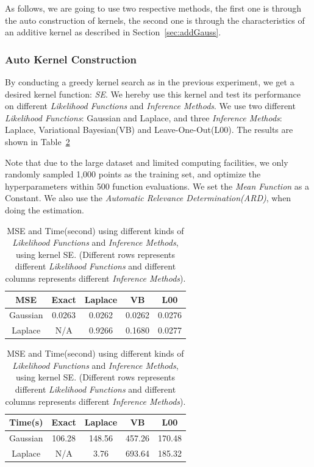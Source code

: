 As follows, we are going to use two respective methods, the first one is through the auto construction of kernels, the second one is through the characteristics of an additive kernel as described in Section~\ref{sec:addGauss}.

\subsubsection{Auto Kernel Construction} \label{sec:pred2auto}
By conducting a greedy kernel search as in the previous experiment, we get a desired kernel function: \emph{SE}.
We hereby use this kernel and test its performance on different \emph{Likelihood Functions} and \emph{Inference Methods}.
We use two different \emph{Likelihood Functions}: Gaussian and Laplace, and three \emph{Inference Methods}: Laplace, Variational Bayesian(VB) and Leave-One-Out(L00). The results are shown in Table~\ref{tab:predict21}

Note that due to the large dataset and limited computing facilities, we only randomly sampled 1,000 points as the training set, and optimize the hyperparameters within 500 function evaluations. We set the \emph{Mean Function} as a Constant.
We also use the \emph{Automatic Relevance Determination(ARD)}\cite{mackay1996bayesian,neal2012bayesian}, when doing the estimation.

\begin{table}[htp]
\centering
{\small
\begin{tabular}{|c|cccc|}
    \hline
	   \textbf{MSE} & Exact & Laplace & VB & L00 \\ 
    \hline
	   Gaussian & \colorbox[rgb]{0.8,0.8,0.8}{0.0263} & \colorbox[rgb]{0.8,0.8,0.8}{0.0262} & \colorbox[rgb]{0.8,0.8,0.8}{0.0262} & 0.0276\\
	   Laplace & N/A & 0.9266 & 0.1680 & \colorbox[rgb]{0.8,0.8,0.8}{0.0277}\\
    \hline
\end{tabular}

\begin{tabular}{|c|cccc|}
    \hline
	   \textbf{Time(s)} & Exact & Laplace & VB & L00 \\ 
    \hline
	   Gaussian & \colorbox[rgb]{0.8,0.8,0.8}{106.28} & 148.56 & 457.26 & 170.48\\
	   Laplace & N/A & 3.76 & 693.64 & \colorbox[rgb]{0.8,0.8,0.8}{185.32}\\
    \hline
\end{tabular}

}
\caption{MSE and Time(second) using different kinds of \emph{Likelihood Functions} and \emph{Inference Methods}, using kernel SE.
(Different rows represents different \emph{Likelihood Functions} and different columns represents different \emph{Inference Methods}). }
\label{tab:predict21}
\end{table}




